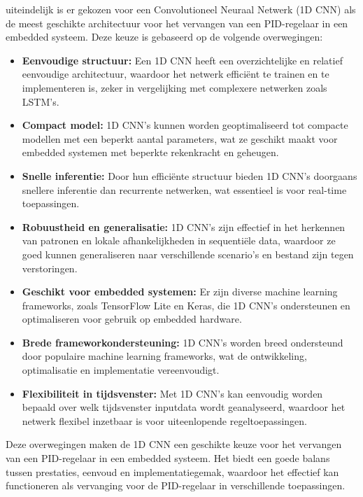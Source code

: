 uiteindelijk is er gekozen voor een Convolutioneel Neuraal Netwerk (1D CNN) als de meest geschikte architectuur voor het vervangen van een PID-regelaar in een embedded systeem. Deze keuze is gebaseerd op de volgende overwegingen:
\begin{itemize}
  \item \textbf{Eenvoudige structuur:} Een 1D CNN heeft een overzichtelijke en relatief eenvoudige architectuur, waardoor het netwerk efficiënt te trainen en te implementeren is, zeker in vergelijking met complexere netwerken zoals LSTM's.
  \item \textbf{Compact model:} 1D CNN's kunnen worden geoptimaliseerd tot compacte modellen met een beperkt aantal parameters, wat ze geschikt maakt voor embedded systemen met beperkte rekenkracht en geheugen.
  \item \textbf{Snelle inferentie:} Door hun efficiënte structuur bieden 1D CNN's doorgaans snellere inferentie dan recurrente netwerken, wat essentieel is voor real-time toepassingen.
  \item \textbf{Robuustheid en generalisatie:} 1D CNN's zijn effectief in het herkennen van patronen en lokale afhankelijkheden in sequentiële data, waardoor ze goed kunnen generaliseren naar verschillende scenario's en bestand zijn tegen verstoringen.
  \item \textbf{Geschikt voor embedded systemen:} Er zijn diverse machine learning frameworks, zoals TensorFlow Lite en Keras, die 1D CNN's ondersteunen en optimaliseren voor gebruik op embedded hardware.
  \item \textbf{Brede frameworkondersteuning:} 1D CNN's worden breed ondersteund door populaire machine learning frameworks, wat de ontwikkeling, optimalisatie en implementatie vereenvoudigt.
  \item \textbf{Flexibiliteit in tijdsvenster:} Met 1D CNN's kan eenvoudig worden bepaald over welk tijdsvenster inputdata wordt geanalyseerd, waardoor het netwerk flexibel inzetbaar is voor uiteenlopende regeltoepassingen.
\end{itemize}
Deze overwegingen maken de 1D CNN een geschikte keuze voor het vervangen van een PID-regelaar in een embedded systeem. Het biedt een goede balans tussen prestaties, eenvoud en implementatiegemak, waardoor het effectief kan functioneren als vervanging voor de PID-regelaar in verschillende toepassingen.








